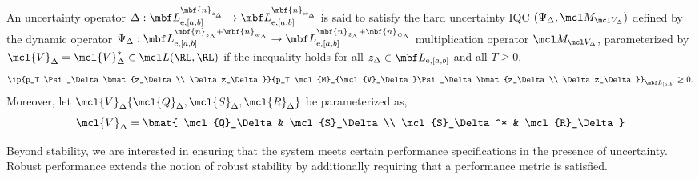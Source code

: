 \begin{definition}\label{def:uncertainty-iqc}
An uncertainty operator
$\Delta:
\mbf L_{\mathrm{e},[a,b]}^{\mbf{n}_{z_\Delta}}
\to
\mbf L_{\mathrm{e},[a,b]}^{\mbf{n}_{w_\Delta}}$
is said to satisfy the hard uncertainty IQC $(\Psi_\Delta, \mcl M_{\mcl V_\Delta})$ defined by the dynamic operator
$\Psi_\Delta:
\mbf L^{\mbf{n}_{z_\Delta} + \mbf{n}_{w_\Delta}}_{\mathrm{e}, [a, b]}
\to
\mbf L^{\mbf{n}_{\tilde{z}_{\Delta}} + \mbf{n}_{\tilde{w}_{\Delta}}}_{\mathrm{e}, [a, b]}$
multiplication operator $\mcl M_{\mcl V_\Delta}$,
parameterized by
$\mcl{V}_\Delta = \mcl{V}_\Delta^* \in \mcl L(\RL, \RL)$
if the inequality holds for all
$z_\Delta \in \mbf L_{\mathrm{e}, [a, b]}$ and all $T \geq 0$,
\begin{equation*}
\ip{p_T \Psi_\Delta \bmat{z_\Delta\\ \Delta z_\Delta}}
{p_T \mcl{M}_{\mcl{V}_\Delta}\Psi_\Delta\bmat{z_\Delta\\ \Delta z_\Delta}}
_{\mbf L_{[a, b]}}
\geq 0.
\end{equation*}
Moreover, let
$\mcl{V}_\Delta\{\mcl{Q}_\Delta, \mcl{S}_\Delta, \mcl{R}_\Delta\}$
be parameterized as,
\begin{equation*}
\mcl{V}_\Delta =
\bmat{
\mcl{Q}_\Delta & \mcl{S}_\Delta \\
\mcl{S}_\Delta^* & \mcl{R}_\Delta
}
\end{equation*}
\end{definition}
Beyond stability, we are interested in ensuring that the system meets certain
performance specifications in the presence of uncertainty.
Robust performance extends the notion of robust stability by additionally
requiring that a performance metric is satisfied.
